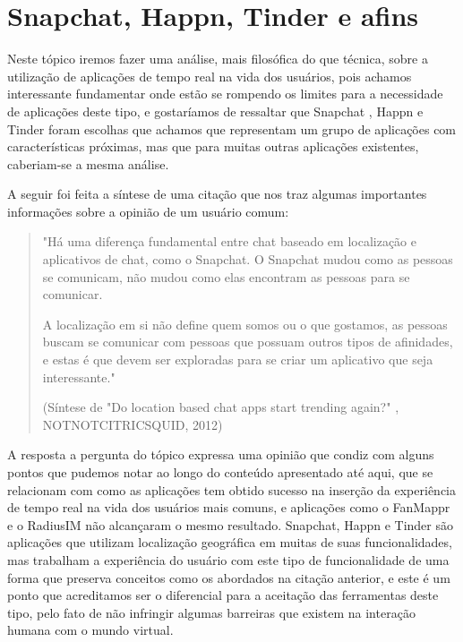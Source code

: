 \section{Snapchat, Happn, Tinder e afins}
Neste tópico iremos fazer uma análise, mais filosófica do que técnica, sobre a utilização de aplicações de tempo real na vida dos usuários, pois achamos interessante fundamentar onde estão se rompendo os limites para a necessidade de aplicações deste tipo, e gostaríamos de ressaltar que Snapchat \cite{snapchat}, Happn \cite{happn} e Tinder \cite{tinder} foram escolhas que achamos que representam um grupo de aplicações com características próximas, mas que para muitas outras aplicações existentes, caberiam-se a mesma análise.

A seguir foi feita a síntese de uma citação \cite{notnotcitricsquid} que nos traz algumas importantes informações sobre a opinião de um usuário comum:

\begin{quote}
	\small "Há uma diferença fundamental entre chat baseado em localização e aplicativos de chat, como o Snapchat. O Snapchat mudou como as pessoas se comunicam, não mudou como elas encontram as pessoas para se comunicar.
	
	A localização em si não define quem somos ou o que gostamos, as pessoas buscam se comunicar com pessoas que possuam outros tipos de afinidades, e estas é que devem ser exploradas para se criar um aplicativo que seja interessante." 
	
	(Síntese de "Do location based chat apps start trending again?" \cite{notnotcitricsquid}, NOTNOTCITRICSQUID, 2012)
\end{quote}

A resposta a pergunta do tópico expressa uma opinião que condiz com alguns pontos que pudemos notar ao longo do conteúdo apresentado até aqui, que se relacionam com como as aplicações tem obtido sucesso na inserção da experiência de tempo real na vida dos usuários mais comuns, e aplicações como o FanMappr e o RadiusIM não alcançaram o mesmo resultado. Snapchat, Happn e Tinder são aplicações que utilizam localização geográfica em muitas de suas funcionalidades, mas trabalham a experiência do usuário com este tipo de funcionalidade de uma forma que preserva conceitos como os abordados na citação anterior, e este é um ponto que acreditamos ser o diferencial para a aceitação das ferramentas deste tipo, pelo fato de não infringir algumas barreiras que existem na interação humana com o mundo virtual.